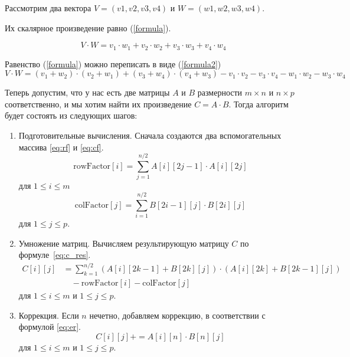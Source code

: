 Рассмотрим два вектора $V = (v1, v2, v3, v4)$ и $W = (w1, w2, w3, w4)$.  

Их скалярное произведение равно (\ref{formula}).

\begin{equation} \label{formula}
	V \cdot W=v_1 \cdot w_1 + v_2 \cdot w_2 + v_3 \cdot w_3 + v_4 \cdot w_4
\end{equation}

Равенство (\ref{formula}) можно переписать в виде (\ref{formula2}) 
\begin{equation} \label{formula2}
	V \cdot W=(v_1 + w_2) \cdot (v_2 + w_1) + (v_3 + w_4) \cdot (v_4 + w_3) - v_1 \cdot v_2 - v_3 \cdot v_4 - w_1 \cdot w_2 - w_3 \cdot w_4
\end{equation}

Теперь допустим, что у нас есть две матрицы $A$ и $B$ размерности $m \times n$ и $n \times p$ соответственно, и мы хотим найти их произведение $C = A \cdot B$.
Тогда алгоритм будет состоять из следующих шагов:

\begin{enumerate}
	\item Подготовительные вычисления. Сначала создаются два вспомогательных массива \eqref{eq:rf} и \eqref{eq:cf}.
	\begin{equation}
	\label{eq:rf}
	\text{{rowFactor}}[i] = \sum_{j=1}^{n/2} A[i][2j-1] \cdot A[i][2j]
	\end{equation}
	для \(1 \leq i \leq m\)
	\begin{equation}
	\label{eq:cf}
	\text{{colFactor}}[j] = \sum_{i=1}^{n/2} B[2i-1][j] \cdot B[2i][j]
	\end{equation}
	для \(1 \leq j \leq p\).
	
	\item Умножение матриц. Вычисляем результирующую матрицу $C$ по формуле~\eqref{eq:c_res}.
	\begin{equation}
		\label{eq:c_res}
		\begin{aligned}
			C[i][j] &= \sum_{k=1}^{n/2} (A[i][2k-1] + B[2k][j]) \cdot (A[i][2k] + B[2k-1][j]) \\
			&\quad - \text{{rowFactor}}[i] - \text{{colFactor}}[j]
		\end{aligned}
	\end{equation}
	для \(1 \leq i \leq m\) и \(1 \leq j \leq p\).
	
	\item Коррекция. Если \(n\) нечетно, добавляем коррекцию, в соответствии с формулой \eqref{eq:er}.
	\begin{equation}
		\label{eq:er}
	C[i][j] += A[i][n] \cdot B[n][j]
	\end{equation}
	для \(1 \leq i \leq m\) и \(1 \leq j \leq p\). 
\end{enumerate}

